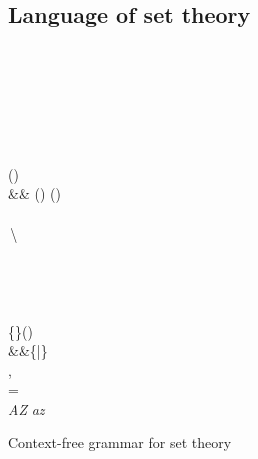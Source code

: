 \documentclass[letterpaper]{article}
\begin{document}
\subsection{Language of set theory}
\begin{table}
\begin{bnf*}
		{}\\
		{\bnfor{}\longleftrightarrow{}}\\
		{\bnfor{}\longleftarrow{}}\\
		{ \bnfor {} \longrightarrow {}}\\
		{ \bnfor {} \lor {}}\\		
		{ \bnfor {} \land {}}\\
	\label{fprod}
		{
		\bnfor \lnot{}
		\bnfor ()}\\
	&&{	\bnfor (\exists{})
		\bnfor (\forall{})
		\bnfor \top \bnfor \bot
		}\\
	\bnfprod{set}
		{\bnfpn{s5}}\\
	\bnfprod{s5}
		{\bnfor{}\,\backslash\,}\\
		{\bnfor{}\,\triangle\,}\\
		{\bnfor{}\,\cup\,}\\
		{\bnfor{}\,\cap\,}\\
		{\bnfor{}\times{}\\}
		{\bnfor\bigcup{}\bnfor\{\}\bnfor()}\\
	&&{\bnfor\{\in{}|\}}\\
		{\bnfor{},}\\
		{\in \bnfor \notin \bnfor \ni \bnfor \not\ni
			\bnfor \subset \bnfor \not\subset
			\bnfor \supset \bnfor \not\supset
			\bnfor = \bnfor \neq
			\bnfor \subsetneqq \bnfor \supsetneqq}\\
	\label{varprod}
		{\textit{A}\bnfsk\textit{Z}
		\bnfor \textit{a}\bnfsk\textit{z}
		\bnfor \alpha \bnfsk \omega
		\bnfor \bnfsk}
\end{bnf*}
\caption{Context-free grammar for set theory}\label{settheorygrammar}
\end{table}
\end{document}
